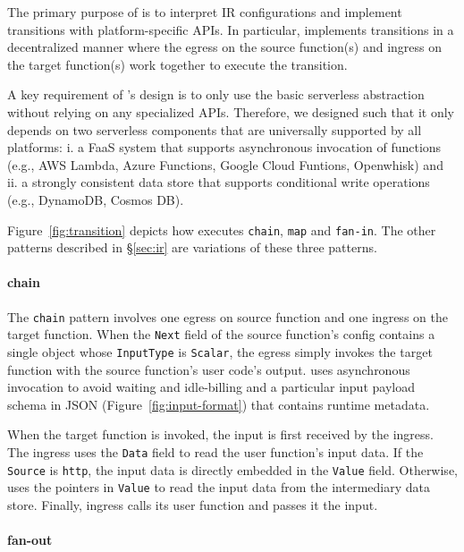 The primary purpose of \deorc{} is to interpret IR configurations and implement
transitions with platform-specific APIs. In particular, \deorc{} implements
transitions in a decentralized manner where the egress on the source
function(s) and ingress on the target function(s) work together to execute the
transition.

A key requirement of \deorc's design is to only use the basic serverless
abstraction without relying on any specialized APIs. Therefore, we designed
\deorc{} such that it only depends on two serverless components that are
universally supported by all platforms: i. a FaaS system that supports
asynchronous invocation of functions (e.g., AWS Lambda, Azure Functions,
Google Cloud Funtions, Openwhisk) and ii. a strongly consistent data store
that supports conditional write operations (e.g., DynamoDB, Cosmos DB).

Figure~\ref{fig:transition} depicts how \deorc{} executes \texttt{chain},
\texttt{map} and \texttt{fan-in}. The other patterns described in
\S\ref{sec:ir} are variations of these three patterns.

\paragraph{chain} 

The \texttt{chain} pattern involves one egress on source function and one
ingress on the target function. When the \texttt{Next} field of the source
function's \name{} config contains a single object whose \texttt{InputType} is
\texttt{Scalar}, the \deorc{} egress simply invokes the target function with
the source function's user code's output. \deorc{} uses asynchronous
invocation to avoid waiting and idle-billing and a particular input payload
schema in JSON (Figure~\ref{fig:input-format}) that contains \name{} runtime
metadata.

When the target function is invoked, the input is first received by the \deorc{}
ingress. The ingress uses the \texttt{Data} field to read the user function's
input data. If the \texttt{Source} is \texttt{http}, the input data is
directly embedded in the \texttt{Value} field. Otherwise,
\name{} uses the pointers in \texttt{Value} to read the input data from the
intermediary data store. Finally, ingress calls its user function and passes
it the input.

\paragraph{fan-out}

